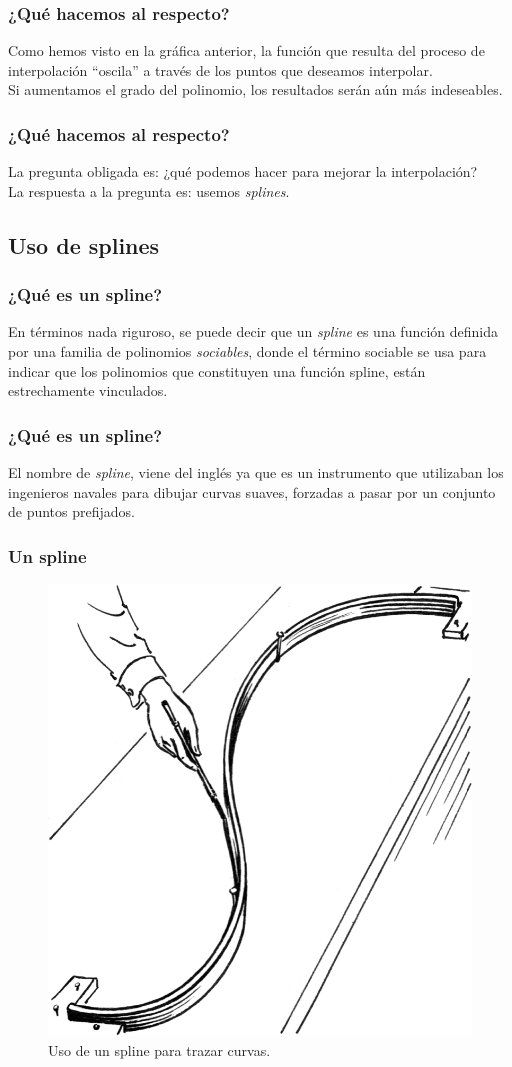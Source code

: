 \begin{frame}
\frametitle{¿Qué hacemos al respecto?}
Como hemos visto en la gráfica anterior, la función que resulta del proceso de interpolación \enquote{oscila} a través de los puntos que deseamos interpolar.
\\
\bigskip
\pause
Si aumentamos el grado del polinomio, los resultados serán aún más indeseables.
\end{frame}
\begin{frame}
\frametitle{¿Qué hacemos al respecto?}
La pregunta obligada es: ¿qué podemos hacer para mejorar la interpolación?
\\
\bigskip
\pause
La respuesta a la pregunta es: usemos \emph{splines}.
\end{frame}
\subsection{Uso de splines}
\begin{frame}
\frametitle{¿Qué es un spline?}
En términos nada riguroso, se puede decir que un \emph{spline} es una función definida por una familia de polinomios \emph{sociables}, donde el término sociable se usa para indicar que los polinomios que constituyen una función spline, están estrechamente vinculados.
\end{frame}
\begin{frame}
\frametitle{¿Qué es un spline?}
El nombre de \emph{spline}, viene del inglés ya que es un instrumento que utilizaban los ingenieros navales para dibujar curvas suaves, forzadas a pasar por un conjunto de puntos prefijados.
\end{frame}
\begin{frame}
\frametitle{Un spline}
\begin{figure}
	\centering
	\includegraphics{Imagenes/spline_01.png}
	\caption{Uso de un spline para trazar curvas.}
	\label{fig:figura_spline_01}
\end{figure}
\end{frame}
